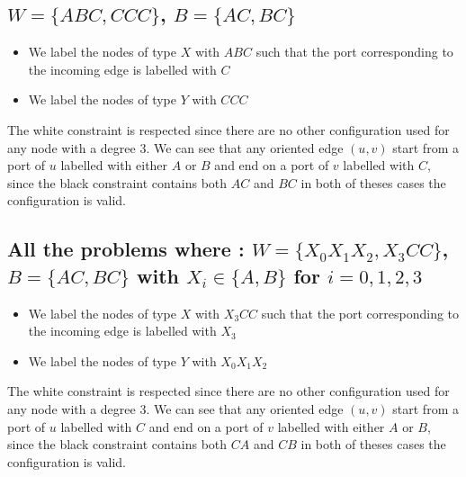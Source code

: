 \subsection[(W = (ABC, CCC), B = (AC,BC)]{$W = \{ABC, CCC\}$, $B = \{AC, BC\}$}
\begin{itemize}
    \item We label the nodes of type $X$ with $ABC$ such that the port corresponding to the incoming edge is labelled with $C$
    \item We label the nodes of type $Y$ with $CCC$
\end{itemize}
The white constraint is respected since there are no other configuration used for any node with a degree 3.
We can see that any oriented edge $(u,v)$ start from a port of $u$ labelled with either $A$ or $B$ and end on a port of $v$ labelled with $C$, since the black constraint contains both $AC$ and $BC$ in both of theses cases the configuration is valid.

\subsection[(W = (X0X1X2, X3CC), B = (AC,BC)]{All the problems where : $W = \{X_0X_1X_2, X_3CC\}$, $B = \{AC, BC\}$ with $X_i \in \{A,B\}$ for $i=0,1,2,3$}
\begin{itemize}
    \item We label the nodes of type $X$ with $X_3CC$ such that the port corresponding to the incoming edge is labelled with $X_3$
    \item We label the nodes of type $Y$ with $X_0X_1X_2$
\end{itemize}
The white constraint is respected since there are no other configuration used for any node with a degree 3.
We can see that any oriented edge $(u,v)$ start from a port of $u$ labelled with $C$ and end on a port of $v$ labelled with either $A$ or $B$, since the black constraint contains both $CA$ and $CB$ in both of theses cases the configuration is valid.


